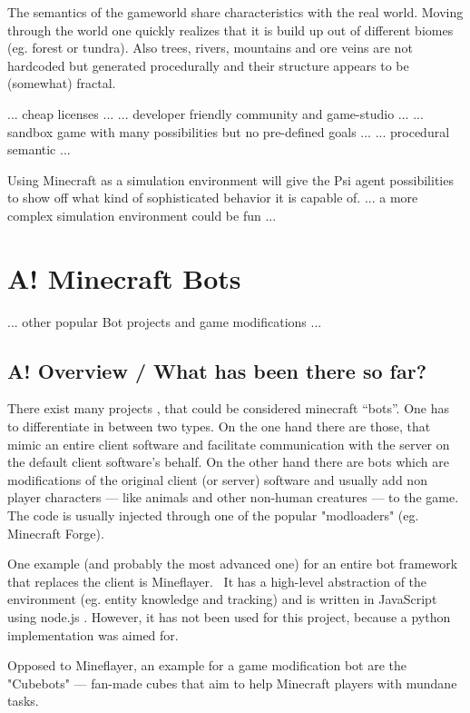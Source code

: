 The semantics of the gameworld share characteristics with the real world. Moving through the world one quickly realizes that it is build up out of different biomes (eg. forest or tundra). Also trees, rivers, mountains and ore veins are not hardcoded but generated procedurally and their structure appears to be (somewhat) fractal.
        
... cheap licenses ...
... developer friendly community and game-studio ...
... sandbox game with many possibilities but no pre-defined goals ...
... procedural semantic ...

Using Minecraft as a simulation environment will give the Psi agent possibilities to show off what kind of sophisticated behavior it is capable of.
... a more complex simulation environment could be fun ...

    \section{A! Minecraft Bots}
    
        ... other popular Bot projects and game modifications ...
    
        \subsection{A! Overview / What has been there so far?}
There exist many projects , that could be considered minecraft ``bots''. One has to differentiate in between two types. On the one hand there are those, that mimic an entire client software and facilitate communication with the server on the default client software's behalf. On the other hand there are bots which are modifications of the original client (or server) software and usually add non player characters --- like animals and other non-human creatures --- to the game. The code is usually injected through one of the popular "modloaders" (eg. Minecraft Forge).

One example (and probably the most advanced one) for an entire bot framework that replaces the client is Mineflayer.~\cite{github_mineflayer} It has a high-level abstraction of the environment (eg. entity knowledge and tracking) and is written in JavaScript using node.js . However, it has not been used for this project, because a python implementation was aimed for.

Opposed to Mineflayer, an example for a game modification bot are the "Cubebots" --- fan-made cubes that aim to help Minecraft players with mundane tasks.\cite{mcforums_cubebots}

